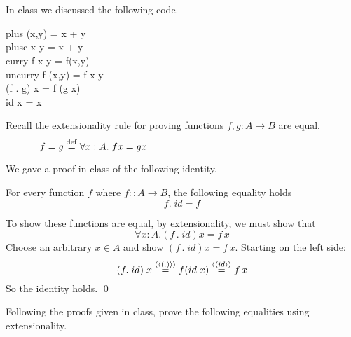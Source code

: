 \documentclass[11pt]{article}
\begin{document}

\section{}

\noindent{}In class we discussed the following code.

\begin{program**}
\>     plus (x,y) = x + y \\
\>     plusc x y = x + y \\
\>     curry f x y  =  f(x,y) \\
\>     uncurry f (x,y) = f x y \\
\>     (f . g) x = f (g x) \\
\>     id x = x \\
\end{program**}

\noindent{}Recall the extensionality rule for proving functions $f,g:A\rightarrow{}B$ are equal.
\[ f = g \;{\stackrel{\rm def}{=}}\; \forall{}x:A. \;f x = g x \hspace{2.5in} \]

We gave a proof in class of the following identity.

\begin{lemma}
For every function $f$ where $f::A \rightarrow B$, the following equality holds
\[ f .\; id = f\]
\end{lemma}
\Proof To show these functions are equal, by extensionality, we must show that
\[\forall{}x:A. (f\,.\;id)x = f\, x\]  Choose an arbitrary $x\in{}A$ and show
$(f\,.\;id)x = f\, x$.  Starting on the left side:
\[(f.\; id)\;x \stackrel{\langle\langle{{(.)}}\rangle\rangle}{=} f(id\; x) \stackrel{\langle\langle{{id}}\rangle\rangle}{=} f \,x\]
So the identity holds.
\qed


\noindent{}Following the proofs given in class, prove the following equalities using extensionality.

\end{document}
